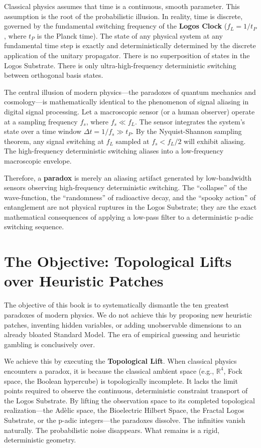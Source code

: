 \documentclass[12pt,twoside]{extbook}
\theoremstyle{definition}
\theoremstyle{remark}
\newcommand{\term}[1]{\textcolor{brandPrimary}{\textbf{#1}}}
\begin{document}
Classical physics assumes that time is a continuous, smooth parameter. This assumption is the root of the probabilistic illusion. In reality, time is discrete, governed by the fundamental switching frequency of the \term{Logos Clock} ($f_L = 1/t_P$, where $t_P$ is the Planck time). The state of any physical system at any fundamental time step is exactly and deterministically determined by the discrete application of the unitary propagator. There is no superposition of states in the Logos Substrate. There is only ultra-high-frequency deterministic switching between orthogonal basis states.

The central illusion of modern physics---the paradoxes of quantum mechanics and cosmology---is mathematically identical to the phenomenon of signal aliasing in digital signal processing. Let a macroscopic sensor (or a human observer) operate at a sampling frequency $f_s$, where $f_s \ll f_L$. The sensor integrates the system's state over a time window $\Delta t = 1/f_s \gg t_P$. By the Nyquist-Shannon sampling theorem, any signal switching at $f_L$ sampled at $f_s < f_L/2$ will exhibit aliasing. The high-frequency deterministic switching aliases into a low-frequency macroscopic envelope.

Therefore, a \term{paradox} is merely an aliasing artifact generated by low-bandwidth sensors observing high-frequency deterministic switching. The ``collapse'' of the wave-function, the ``randomness'' of radioactive decay, and the ``spooky action'' of entanglement are not physical ruptures in the Logos Substrate; they are the exact mathematical consequences of applying a low-pass filter to a deterministic p-adic switching sequence.

\section*{The Objective: Topological Lifts over Heuristic Patches}
The objective of this book is to systematically dismantle the ten greatest paradoxes of modern physics. We do not achieve this by proposing new heuristic patches, inventing hidden variables, or adding unobservable dimensions to an already bloated Standard Model. The era of empirical guessing and heuristic gambling is conclusively over.

We achieve this by executing the \term{Topological Lift}. When classical physics encounters a paradox, it is because the classical ambient space (e.g., $\mathbb{R}^4$, Fock space, the Boolean hypercube) is topologically incomplete. It lacks the limit points required to observe the continuous, deterministic constraint transport of the Logos Substrate. By lifting the observation space to its completed topological realization---the Adèlic space, the Bioelectric Hilbert Space, the Fractal Logos Substrate, or the p-adic integers---the paradoxes dissolve. The infinities vanish naturally. The probabilistic noise disappears. What remains is a rigid, deterministic geometry.
\end{document}
